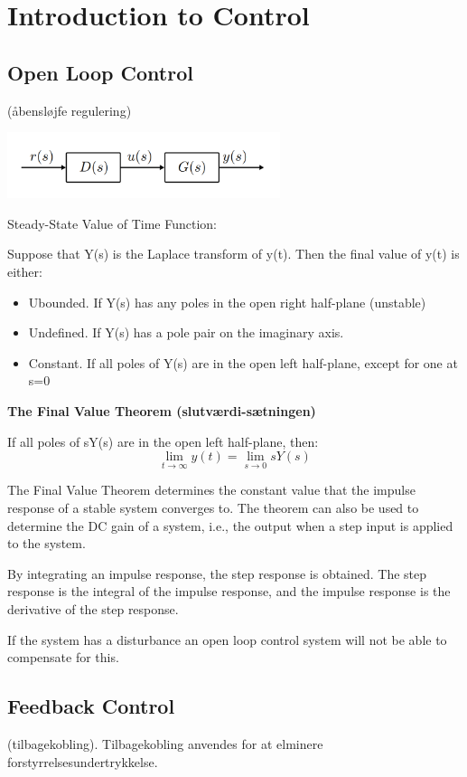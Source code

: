 \section{Introduction to Control}

\subsection{Open Loop Control}
(åbensløjfe regulering)

\begin{center}
	\includegraphics[width=0.6\textwidth]{Images/openLoopControl.png}
\end{center}


Steady-State Value of Time Function:

Suppose that Y(s) is the Laplace transform of y(t). Then the final value of y(t) is either:
\begin{itemize}
	\item{Ubounded. If Y(s) has any poles in the open right half-plane (unstable)}
	\item{Undefined. If Y(s) has a pole pair on the imaginary axis.}
	\item{Constant. If all poles of Y(s) are in the open left half-plane, except for one at s=0}
\end{itemize}

\textbf{The Final Value Theorem (slutværdi-sætningen)}

If all poles of sY(s) are in the open left half-plane, then:
$$\lim_{t \to \infty} y(t) = \lim_{s \to 0} sY(s)$$

The Final Value Theorem determines the constant value that the impulse response of a stable system converges to.
The theorem can also be used to determine the DC gain of a system, i.e., the output when a step input is applied to the system.

By integrating an impulse response, the step response is obtained. The step response is the integral of the impulse response,
and the impulse response is the derivative of the step response.

If the system has a disturbance an open loop control system will not be able to compensate for this.

\subsection{Feedback Control}
(tilbagekobling). Tilbagekobling anvendes for at elminere forstyrrelsesundertrykkelse.

